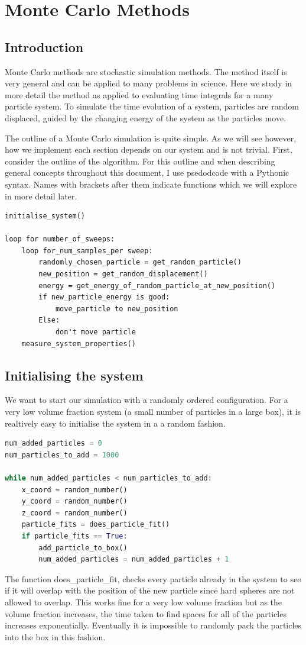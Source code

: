 \section{Monte Carlo Methods}
	\subsection{Introduction}
		Monte Carlo methods are stochastic simulation methods. The method itself is very general and can be applied to many problems in science. Here we study in more detail the method as applied to evaluating time integrals for a many particle system. To simulate the time evolution of a system, particles are random displaced, guided by the changing energy of the system as the particles move.

		The outline of a Monte Carlo simulation is quite simple. As we will see however, how we implement each section depends on our system and is not trivial. First, consider the outline of the algorithm. For this outline and when describing general concepts throughout this document, I use psedodcode with a Pythonic syntax. Names with brackets after them indicate functions which we will explore in more detail later.
	\begin{lstlisting}
initialise_system()

loop for number_of_sweeps:
	loop for_num_samples_per sweep:
		randomly_chosen_particle = get_random_particle()
		new_position = get_random_displacement()
		energy = get_energy_of_random_particle_at_new_position()
		if new_particle_energy is good:
			move_particle to new_position
		Else:
			don't move particle
	measure_system_properties()\end{lstlisting}


	\subsection{Initialising the system}\label{lattice}
		We want to start our simulation with a randomly ordered configuration. For a very low volume fraction system (a small number of particles in a large box), it is realtively easy to initialise the system in a a random fashion.
		\begin{lstlisting}[language=Python]
num_added_particles = 0
num_particles_to_add = 1000

while num_added_particles < num_particles_to_add:
	x_coord = random_number()
	y_coord = random_number()
	z_coord = random_number()
	particle_fits = does_particle_fit()
	if particle_fits == True:
		add_particle_to_box()
		num_added_particles = num_added_particles + 1\end{lstlisting}
The function does\_particle\_fit, checks every particle already in the system to see if it will overlap with the position of the new particle since hard spheres are not allowed to overlap. This works fine for a very low volume fraction but as the volume fraction increases, the time taken to find spaces for all of the particles increases exponentially. Eventually it is impossible to randomly pack the particles into the box in this fashion.

